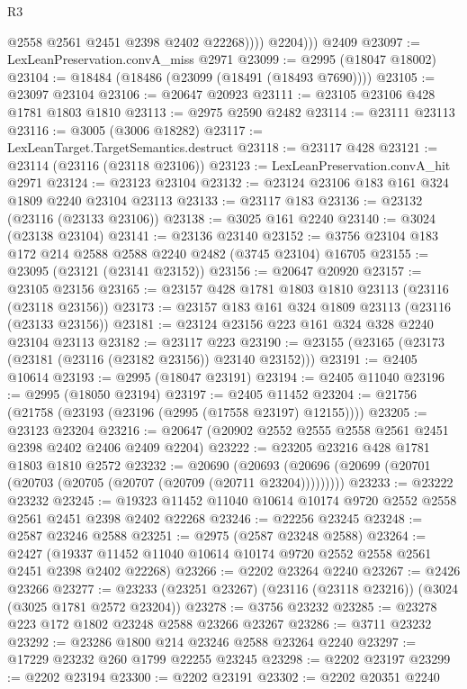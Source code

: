 \begin{lexlean}{R3}
\begin{coremodule}
                @2558
                @2561
                @2451
                @2398
                @2402
                @22268))))
          @2204)))
    @2409
@23097 := LexLeanPreservation.convA_miss @2971
@23099 := @2995 (@18047 @18002)
@23104 := @18484 (@18486 (@23099 (@18491 (@18493 @7690))))
@23105 := @23097 @23104
@23106 := @20647 @20923
@23111 := @23105 @23106 @428 @1781 @1803 @1810
@23113 := @2975 @2590 @2482
@23114 := @23111 @23113
@23116 := @3005 (@3006 @18282)
@23117 := LexLeanTarget.TargetSemantics.destruct
@23118 := @23117 @428
@23121 := @23114 (@23116 (@23118 @23106))
@23123 := LexLeanPreservation.convA_hit @2971
@23124 := @23123 @23104
@23132 := @23124 @23106 @183 @161 @324 @1809 @2240 @23104 @23113
@23133 := @23117 @183
@23136 := @23132 (@23116 (@23133 @23106))
@23138 := @3025 @161 @2240
@23140 := @3024 (@23138 @23104)
@23141 := @23136 @23140
@23152 := @3756 @23104 @183 @172 @214 @2588 @2588 @2240 @2482 (@3745 @23104) @16705
@23155 := @23095 (@23121 (@23141 @23152))
@23156 := @20647 @20920
@23157 := @23105 @23156
@23165 := @23157 @428 @1781 @1803 @1810 @23113 (@23116 (@23118 @23156))
@23173 := @23157 @183 @161 @324 @1809 @23113 (@23116 (@23133 @23156))
@23181 := @23124 @23156 @223 @161 @324 @328 @2240 @23104 @23113
@23182 := @23117 @223
@23190 := @23155 (@23165 (@23173 (@23181 (@23116 (@23182 @23156)) @23140 @23152)))
@23191 := @2405 @10614
@23193 := @2995 (@18047 @23191)
@23194 := @2405 @11040
@23196 := @2995 (@18050 @23194)
@23197 := @2405 @11452
@23204 := @21756 (@21758 (@23193 (@23196 (@2995 (@17558 @23197) @12155))))
@23205 := @23123 @23204
@23216 := @20647 (@20902 @2552 @2555 @2558 @2561 @2451 @2398 @2402 @2406 @2409 @2204)
@23222 := @23205 @23216 @428 @1781 @1803 @1810 @2572
@23232 := @20690
    (@20693 (@20696 (@20699 (@20701 (@20703 (@20705 (@20707 (@20709 (@20711 @23204)))))))))
@23233 := @23222 @23232
@23245 := @19323 @11452 @11040 @10614 @10174 @9720 @2552 @2558 @2561 @2451 @2398 @2402 @22268
@23246 := @22256 @23245
@23248 := @2587 @23246 @2588
@23251 := @2975 (@2587 @23248 @2588)
@23264 := @2427
    (@19337 @11452 @11040 @10614 @10174 @9720 @2552 @2558 @2561 @2451 @2398 @2402 @22268)
@23266 := @2202 @23264 @2240
@23267 := @2426 @23266
@23277 := @23233 (@23251 @23267) (@23116 (@23118 @23216)) (@3024 (@3025 @1781 @2572 @23204))
@23278 := @3756 @23232
@23285 := @23278 @223 @172 @1802 @23248 @2588 @23266 @23267
@23286 := @3711 @23232
@23292 := @23286 @1800 @214 @23246 @2588 @23264 @2240
@23297 := @17229 @23232 @260 @1799 @22255 @23245
@23298 := @2202 @23197
@23299 := @2202 @23194
@23300 := @2202 @23191
@23302 := @2202 @20351 @2240

\end{coremodule}
\end{lexlean}
